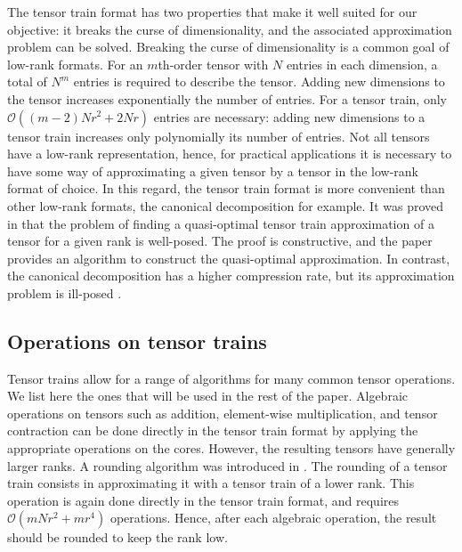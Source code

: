 \documentclass{article}
\begin{document}
The tensor train format has two properties that make it well suited for our objective: it breaks the curse of dimensionality, and the associated approximation problem can be solved. 
Breaking the curse of dimensionality is a common goal of low-rank formats. 
For an $m$th-order tensor with $N$ entries in each dimension, a total of $N^m$ entries is required to describe the tensor. 
Adding new dimensions to the tensor increases exponentially the number of entries. 
For a tensor train, only $\mathcal O((m-2)Nr^2+2Nr)$ entries are necessary: adding new dimensions to a tensor train increases only polynomially its number of entries. 
Not all tensors have a low-rank representation, hence, for practical applications it is necessary to have some way of approximating a given tensor by a tensor in the low-rank format of choice.
In this regard, the tensor train format is more convenient than other low-rank formats, the canonical decomposition for example.
It was proved in  \cite{oseledets_tensor-train_2011} that the problem of finding a quasi-optimal tensor train approximation of a tensor for a given rank is well-posed. 
The proof is constructive, and the paper provides an algorithm to construct the quasi-optimal approximation.
In contrast, the canonical decomposition has a higher compression rate, but its approximation problem is ill-posed \cite{de_silva_tensor_2008}.

\subsection{Operations on tensor trains}

Tensor trains allow for a range of algorithms for many common tensor operations. 
We list here the ones that will be used in the rest of the paper. 
Algebraic operations on tensors such as addition, element-wise multiplication, and tensor contraction can be done directly in the tensor train format by applying the appropriate operations on the cores. 
However, the resulting tensors have generally larger ranks.
A rounding algorithm was introduced in \cite{oseledets_tensor-train_2011}. 
The rounding of a tensor train consists in approximating it with a tensor train of a lower rank. This operation is again done directly in the tensor train format, and requires $\mathcal O(mNr^2+mr^4)$ operations. 
Hence, after each algebraic operation, the result should be rounded to keep the rank low.
\end{document}
